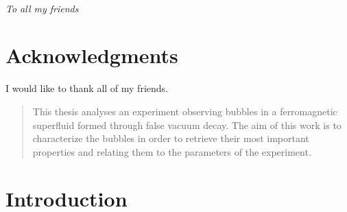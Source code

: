 

\LogoWidth{4.5cm} %

\begin{titlepage}
    \pagestyle{empty}
    \makefrontpage
    \restoregeometry
\end{titlepage}

\thispagestyle{empty} %

\frontmatter
~ \newpage
\null{}
\begin{flushright}
    \textit{To all my friends}
\end{flushright}
\null

\chapter*{Acknowledgments}
I would like to thank all of my friends.

\begin{abstract}
    This thesis analyses an experiment observing bubbles in a ferromagnetic superfluid formed through false vacuum decay. The aim of this work is to characterize the bubbles in order to retrieve their most important properties and relating them to the parameters of the experiment.
\end{abstract}

\tableofcontents



\mainmatter
\chapter*{Introduction}
